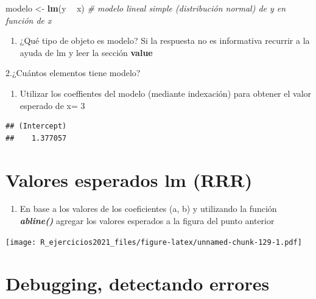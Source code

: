 \documentclass[]{book}
\newenvironment{Shaded}{\begin{snugshade}}{\end{snugshade}}
\newcommand{\CommentTok}[1]{\textcolor[rgb]{0.56,0.35,0.01}{\textit{#1}}}
\newcommand{\KeywordTok}[1]{\textcolor[rgb]{0.13,0.29,0.53}{\textbf{#1}}}
\newcommand{\NormalTok}[1]{#1}
\newcommand{\OperatorTok}[1]{\textcolor[rgb]{0.81,0.36,0.00}{\textbf{#1}}}
\newcommand{\StringTok}[1]{\textcolor[rgb]{0.31,0.60,0.02}{#1}}
\providecommand{\tightlist}{%
  \setlength{\itemsep}{0pt}\setlength{\parskip}{0pt}}
\begin{document}
\begin{Shaded}
\begin{Highlighting}[]
\NormalTok{modelo <-}\StringTok{ }\KeywordTok{lm}\NormalTok{(y }\OperatorTok{~}\StringTok{ }\NormalTok{x) }\CommentTok{# modelo lineal simple (distribución normal) de y en función de x }
\end{Highlighting}
\end{Shaded}

\begin{enumerate}
\def\labelenumi{\arabic{enumi}.}
\tightlist
\item
  ¿Qué tipo de objeto es modelo? Si la respuesta no es informativa recurrir a la ayuda de lm y leer la sección \textbf{value}
\end{enumerate}

2.¿Cuántos elementos tiene modelo?

\begin{enumerate}
\def\labelenumi{\arabic{enumi}.}
\setcounter{enumi}{2}
\tightlist
\item
  Utilizar los coeffientes del modelo (mediante indexación) para obtener el valor esperado de x= 3
\end{enumerate}

\begin{verbatim}
## (Intercept) 
##    1.377057
\end{verbatim}

\hypertarget{valores-esperados-lm-rrr}{%
\section{Valores esperados lm (RRR)}\label{valores-esperados-lm-rrr}}

\begin{enumerate}
\def\labelenumi{\arabic{enumi}.}
\tightlist
\item
  En base a los valores de los coeficientes (a, b) y utilizando la función \textbf{\emph{abline()}} agregar los valores esperados a la figura del punto anterior
\end{enumerate}

\texttt{[image: R\_ejercicios2021\_files/figure-latex/unnamed-chunk-129-1.pdf]}

\hypertarget{debugging-detectando-errores-4}{%
\section{Debugging, detectando errores}\label{debugging-detectando-errores-4}}
\end{document}
